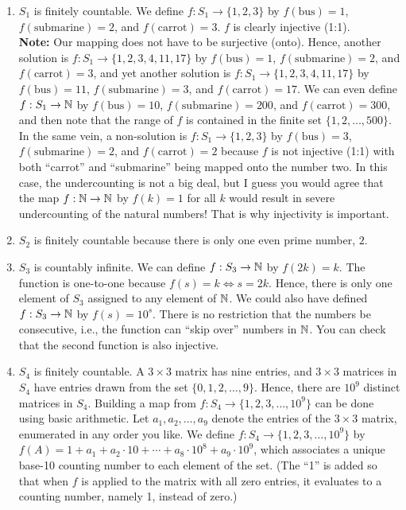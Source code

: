     \begin{enumerate}
\renewcommand{\labelenumi}{(\alph{enumi})}
\setlength{\itemsep}{.2cm}

\item $S_1$ is finitely countable. We define $f:S_1\to \{1, 2, 3\}$ by $f(\text{bus}) =1$,  $f(\text{submarine}) = 2$, and $f(\text{carrot}) =3$. $f$ is clearly injective (1:1). \\

\textbf{Note:} Our mapping does not have to be surjective (onto). Hence, another solution is  $f: S_1 \to \{1, 2, 3, 4, 11, 17\}$ by $f(\text{bus}) =1$,  $f(\text{submarine}) = 2$, and $f(\text{carrot}) =3$, and yet another solution is $f: S_1 \to \{1, 2, 3, 4, 11, 17\}$ by $f(\text{bus}) =11$,  $f(\text{submarine}) = 3$, and $f(\text{carrot}) =17$. We can even define  $f: S_1 \to \mathbb N$ by $f(\text{bus}) =10$,  $f(\text{submarine}) = 200$, and $f(\text{carrot}) =300$, and then note that the range of $f$ is contained in the finite set $\{1, 2, \ldots, 500 \}$.\\

In the same vein, a non-solution is $f:S_1\to \{1, 2, 3\}$ by $f(\text{bus}) = 3$,  $f(\text{submarine}) = 2$, and $f(\text{carrot}) =2$ because $f$ is not injective (1:1) with both ``carrot'' and ``submarine'' being mapped onto the number two. In this case, the undercounting is not a big deal, but I guess you would agree that the map $f:\mathbb N \to \mathbb N$ by $f(k)=1$ for all $k$ would result in severe undercounting of the natural numbers! That is why injectivity is important.

\item $S_2$ is finitely countable because there is only one even prime number, $2$. 

\item $S_3$ is countably infinite. We can define $f:S_3 \to \mathbb N$ by $f(2k) = k$. The function is one-to-one because $f(s)=k \iff s = 2k$. Hence, there is only one element of $S_3$ assigned to any element of $\mathbb N$. We could also have defined $f:S_3 \to \mathbb N$ by $f(s) = 10^s$. There is no restriction that the numbers be consecutive, i.e., the function can ``skip over'' numbers in $\mathbb N$. You can check that the second function is also injective.

\item $S_4$ is finitely countable. A $3 \times 3$ matrix has nine entries, and $3 \times 3$ matrices in $S_4$ have entries drawn from the set $\{0, 1, 2, \ldots, 9\}$. Hence, there are $10^9$ distinct matrices in $S_4$. Building a map from $f:S_4 \to \{1, 2, 3, \ldots, 10^9\}$ can be done using basic arithmetic. Let $a_1, a_2, \ldots, a_9$ denote the entries of the $3 \times 3$ matrix, enumerated in any order you like. We define $f:S_4 \to \{1, 2, 3, \ldots, 10^9\}$ by $f(A) = 1 + a_1 + a_2 \cdot 10 + \cdots + a_8 \cdot 10^8 + a_9 \cdot 10^9$, which associates a unique base-10 counting number to each element of the set. (The ``1'' is added so that when $f$ is applied to the matrix with all zero entries, it evaluates to a counting number, namely 1, instead of zero.) 


\end{enumerate}
